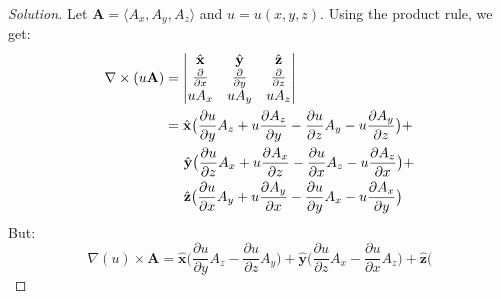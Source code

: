 \documentclass[crop=false,class=article,oneside]{standalone}
\begin{document}
        \begin{proof}[Solution]
            Let $\mathbf{A}=\langle{A_{x},A_{y},A_{z}}\rangle$
            and $u=u(x,y,z)$.
            Using the product rule, we get:
            \begin{align*}
                \nabla\times (u\mathbf{A})
                &=
                \begin{vmatrix}
                    \hat{\mathbf{x}}
                    &\hat{\mathbf{y}}
                    &\hat{\mathbf{z}}\\
                    \frac{\partial}{\partial{x}}
                    &\frac{\partial}{\partial{y}}
                    &\frac{\partial}{\partial{z}}\\
                    uA_{x}
                    &uA_{y}
                    &uA_{z}
                \end{vmatrix}\\
                &=\hat{\mathbf{x}}\big(
                    \frac{\partial{u}}{\partial{y}}A_{z}
                    +u\frac{\partial{A_{z}}}{\partial{y}}
                    -\frac{\partial{u}}{\partial{z}}A_{y}
                    -u\frac{\partial{A_{y}}}{\partial{z}}
                \big)+\\
                &\hspace{1.4em}\hat{\mathbf{y}}\big(
                    \frac{\partial{u}}{\partial{z}}A_{x}
                    +u\frac{\partial{A_{x}}}{\partial{z}}
                    -\frac{\partial{u}}{\partial{x}}A_{z}
                    -u\frac{\partial{A_{z}}}{\partial{x}}
                \big)+\\
                &\hspace{1.4em}
                \hat{\mathbf{z}}\big(
                    \frac{\partial{u}}{\partial{x}}A_{y}+
                    u\frac{\partial{A_{y}}}{\partial{x}}
                    -\frac{\partial{u}}{\partial{y}}A_{x}
                    -u\frac{\partial{A_{x}}}{\partial{y}}
                \big)
            \end{align*}
            But:
            \begin{equation*}
                \nabla(u)\times\mathbf{A}
                =\hat{\mathbf{x}}\big(
                    \frac{\partial u}{\partial y}
                    A_{z}-\frac{\partial u}{\partial z}A_{y}
                \big)
                +\hat{\mathbf{y}}\big(
                    \frac{\partial u}{\partial z}A_{x}
                    -\frac{\partial u}{\partial x}A_{z}
                \big)
                +\hat{\mathbf{z}}\big(

\end{equation*}
\end{proof}
\end{document}
